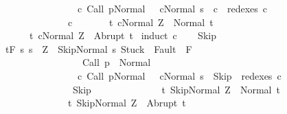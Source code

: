 \begin{isabellebody}
\ \ \ \ \ \ \ \ \ \ \ \ \ \ \ \ {\isacharparenleft}{\isasymexists}c{\isacharprime}{\isachardot}\ {\isasymGamma}{\isasymturnstile}{\isacharparenleft}Call\ p{\isacharcomma}Normal\ {\isasymsigma}{\isacharparenright}\ {\isasymrightarrow}\isactrlsup {\isacharplus}\ {\isacharparenleft}c{\isacharprime}{\isacharcomma}Normal\ s{\isacharparenright}\ {\isasymand}\ c\ {\isasymin}\ redexes\ c{\isacharprime}{\isacharparenright}{\isacharbraceright}\ \isanewline
\ \ \ \ \ \ \ \ \ \ \ \ \ \ c\ \isanewline
\ \ \ \ \ \ {\isacharbraceleft}t{\isachardot}\ {\isasymGamma}{\isasymturnstile}{\isasymlangle}c{\isacharcomma}Normal\ Z{\isasymrangle}\ {\isasymRightarrow}\ Normal\ t{\isacharbraceright}{\isacharcomma}\isanewline
\ \ \ \ \ \ {\isacharbraceleft}t{\isachardot}\ {\isasymGamma}{\isasymturnstile}{\isasymlangle}c{\isacharcomma}Normal\ Z{\isasymrangle}\ {\isasymRightarrow}\ Abrupt\ t{\isacharbraceright}{\isachardoublequoteclose}\isanewline
%
\isadelimproof
%
\endisadelimproof
%
\isatagproof
{}\isamarkupfalse%
\ {\isacharparenleft}induct\ c{\isacharparenright}\isanewline
\ \ \isamarkupfalse%
\ Skip\isanewline
\ \ \isamarkupfalse%
\ {\isachardoublequoteopen}{\isasymGamma}{\isacharcomma}{\isasymTheta}{\isasymturnstile}\isactrlsub t\isactrlbsub {\isacharslash}F\isactrlesub \ {\isacharbraceleft}s{\isachardot}\ s\ {\isacharequal}\ Z\ {\isasymand}\ {\isasymGamma}{\isasymturnstile}{\isasymlangle}Skip{\isacharcomma}Normal\ s{\isasymrangle}\ {\isasymRightarrow}{\isasymnotin}{\isacharparenleft}{\isacharbraceleft}Stuck{\isacharbraceright}\ {\isasymunion}\ Fault\ {\isacharbackquote}\ {\isacharparenleft}{\isacharminus}F{\isacharparenright}{\isacharparenright}\ {\isasymand}\ \isanewline
\ \ \ \ \ \ \ \ \ \ \ \ \ \ \ \ \ {\isasymGamma}{\isasymturnstile}Call\ p\ {\isasymdown}\ Normal\ {\isasymsigma}\ {\isasymand}\isanewline
\ \ \ \ \ \ \ \ \ \ \ \ \ \ \ \ {\isacharparenleft}{\isasymexists}c{\isacharprime}{\isachardot}\ {\isasymGamma}{\isasymturnstile}{\isacharparenleft}Call\ p{\isacharcomma}Normal\ {\isasymsigma}{\isacharparenright}\ {\isasymrightarrow}\isactrlsup {\isacharplus}\ {\isacharparenleft}c{\isacharprime}{\isacharcomma}Normal\ s{\isacharparenright}\ {\isasymand}\ Skip\ {\isasymin}\ redexes\ c{\isacharprime}{\isacharparenright}{\isacharbraceright}\isanewline
\ \ \ \ \ \ \ \ \ \ \ \ \ \ \ Skip\isanewline
\ \ \ \ \ \ \ \ \ \ \ \ \ \ {\isacharbraceleft}t{\isachardot}\ {\isasymGamma}{\isasymturnstile}{\isasymlangle}Skip{\isacharcomma}Normal\ Z{\isasymrangle}\ {\isasymRightarrow}\ Normal\ t{\isacharbraceright}{\isacharcomma}\isanewline
\ \ \ \ \ \ \ \ \ \ \ \ \ \ {\isacharbraceleft}t{\isachardot}\ {\isasymGamma}{\isasymturnstile}{\isasymlangle}Skip{\isacharcomma}Normal\ Z{\isasymrangle}\ {\isasymRightarrow}\ Abrupt\ t{\isacharbraceright}{\isachardoublequoteclose}\isanewline

\end{isabellebody}

